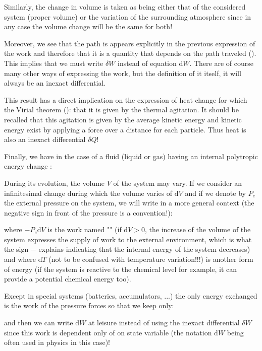 	Similarly, the change in volume is taken as being either that of the considered system (proper volume) or the variation of the surrounding atmosphere since in any case the volume change will be the same for both!

	Moreover, we see that the path is appears explicitly in the previous expression of the work and therefore that it is a quantity that depends on the path traveled (). This implies that we must write $\delta W$ instead of equation $\mathrm{d}W$. There are of course many other ways of expressing the work, but the definition of it itself, it will always be an inexact differential.

	This result has a direct implication on the expression of heat change for which the Virial theorem (): that it is given by the thermal agitation. It should be recalled that this agitation is given by the average kinetic energy and kinetic energy exist by applying a force over a distance for each particle. Thus heat is also an inexact differential $\delta Q$!

	Finally, we have in the case of a fluid (liquid or gas) having an internal polytropic energy change :
	
	During its evolution, the volume $V$ of the system may vary. If we consider an infinitesimal change during which the volume varies of $\mathrm{d}V$ and if we denote  by $P_e$ the external pressure on the system, we will write in a more general context (the negative sign in front of the pressure is a convention!):
	
	where $-P_e\mathrm{d}V$ is the work named "" (if $\mathrm{d}V>0$, the increase of the volume of the system expresses the supply of work to the external environment, which is what the sign $-$ explains indicating that the internal energy of the system decreases) and where $\mathrm{d}T$ (not to be confused with temperature variation!!!) is another form of energy (if the system is reactive to the chemical level for example, it can provide a potential chemical energy too).

	Except in special systems (batteries, accumulators, ...) the only energy exchanged is the work of the pressure forces so that we keep only:
	
	and then we can write $\mathrm{d}W$ at leisure instead of using the inexact differential $\delta W$ since this work is dependent only of on state variable (the notation $\mathrm{d}W$ being often used in physics in this case)!

